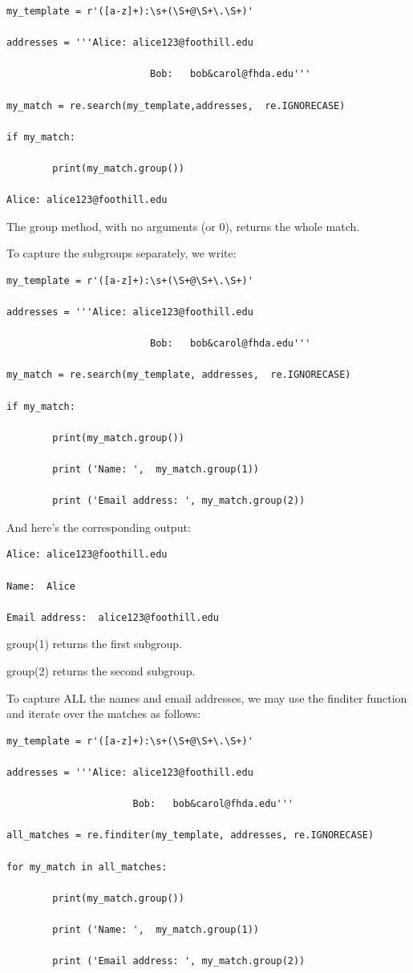 \documentclass{article}
\begin{document}
\begin{lstlisting}
my_template = r'([a-z]+):\s+(\S+@\S+\.\S+)'

addresses = '''Alice: alice123@foothill.edu

                         Bob:   bob&carol@fhda.edu'''

my_match = re.search(my_template,addresses,  re.IGNORECASE)

if my_match:

        print(my_match.group())

Alice: alice123@foothill.edu
\end{lstlisting}

The group method, with no arguments (or 0), returns the whole match.

To capture the subgroups separately, we write:

\begin{lstlisting}
my_template = r'([a-z]+):\s+(\S+@\S+\.\S+)'

addresses = '''Alice: alice123@foothill.edu

                         Bob:   bob&carol@fhda.edu'''

my_match = re.search(my_template, addresses,  re.IGNORECASE)

if my_match:

        print(my_match.group())

        print ('Name: ',  my_match.group(1))

        print ('Email address: ', my_match.group(2))
\end{lstlisting}

And here's the corresponding output:

\begin{lstlisting}
Alice: alice123@foothill.edu

Name:  Alice

Email address:  alice123@foothill.edu
\end{lstlisting}

group(1) returns the first subgroup.

group(2) returns the second subgroup.

To capture ALL the names and email addresses, we may use the finditer function and iterate over the matches as follows:

\begin{lstlisting}
my_template = r'([a-z]+):\s+(\S+@\S+\.\S+)'

addresses = '''Alice: alice123@foothill.edu

                      Bob:   bob&carol@fhda.edu'''

all_matches = re.finditer(my_template, addresses, re.IGNORECASE)

for my_match in all_matches:

        print(my_match.group())

        print ('Name: ',  my_match.group(1))

        print ('Email address: ', my_match.group(2))
\end{lstlisting}
\end{document}
